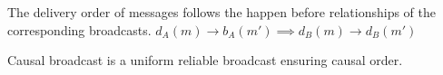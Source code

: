 

\begin{definition}
  The delivery order of messages follows the happen before relationships of the
  corresponding broadcasts.
  $d_A(m) \rightarrow b_A(m') \implies d_B(m) \rightarrow d_B(m')$
\end{definition}

\begin{definition}
  Causal broadcast is a uniform reliable broadcast ensuring causal order.
\end{definition}



%     


